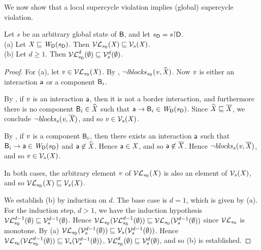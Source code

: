 We now show that a local supercycle violation implies (global) supercycle violation.

\begin{proposition}
\label{prop:lV-subg-V}
Let $s$ be an arbitrary global state of $\B$, and let $\sD = s \pj \DS$.\\
(a) Let $\XS \subg \lwfg{B}{\sD}{\DS}$. Then $\lVFs{\sD}{\XS} \subg \VFs{s}{\XS}$.\\
(b) Let $d \ge 1$. Then $\lVFsi{\sD}{\ewfg}{d} \subg \VFsi{s}{\ewfg}{d}$.
\end{proposition}
%
\begin{proof}
For (a), let $\ndv \in \lVFs{\sD}{\XS}$. By , $\neg \lblocks{\sD}{\ndv}{\complL{\XS}}$.
Now $\ndv$ is either an interaction $\act$ or a component $\B_i$. 

By , if $\ndv$ is an interaction $\act$, then it is not a border interaction, and furthermore there is no
component $\B_i \in \complL{\XS}$ such that $\act \ar \B_i \in \lwfg{\B}{\sD}{\DS}$. 
Since $\complL{\XS} \subg \compl{\XS}$, we conclude $\neg \blocks{s}{\ndv}{\compl{\XS}}$, and so $\ndv \in \VFs{s}{\XS}$.

By , if $\ndv$ is a component $\B_i$, then there exists an interaction $\act$ such that 
$\B_i \ar \act \in \lwfg{\B}{\sD}{\DS}$ and $\act \not\in \complL{\XS}$. Hence $\act \in \XS$, and so $\act \not\in \compl{\XS}$.
Hence  $\neg \blocks{s}{\ndv}{\compl{\XS}}$, and so $\ndv \in \VFs{s}{\XS}$.

In both cases, the arbitrary element $\ndv$ of $\lVFs{\sD}{\XS}$ is also an element of $\VFs{s}{\XS}$, and so 
$\lVFs{\sD}{\XS} \subg \VFs{s}{\XS}$.

We establish (b) by induction on $d$. The base case is $d=1$, which is given by (a).
For the induction step, $d > 1$, we have the induction hypothesis
$\lVFsi{\sD}{\ewfg}{d-1} \subg \VFsi{s}{\ewfg}{d-1}$.
Hence $\lVFs{\sD}{\lVFsi{\sD}{\ewfg}{d-1}} \subg \lVFs{\sD}{\VFsi{s}{\ewfg}{d-1}}$ since $\lVFsymb_{\sD}$ is monotone.
By (a) $\lVFs{\sD}{\VFsi{s}{\ewfg}{d-1}} \subg \VFs{s}{\VFsi{s}{\ewfg}{d-1}}$.
Hence $\lVFs{\sD}{\lVFsi{\sD}{\ewfg}{d-1}}   \subg \VFs{s}{\VFsi{s}{\ewfg}{d-1}}$, \ie
$\lVFsi{\sD}{\ewfg}{d}   \subg \VFsi{s}{\ewfg}{d}$, and so (b) is established.
\end{proof}


